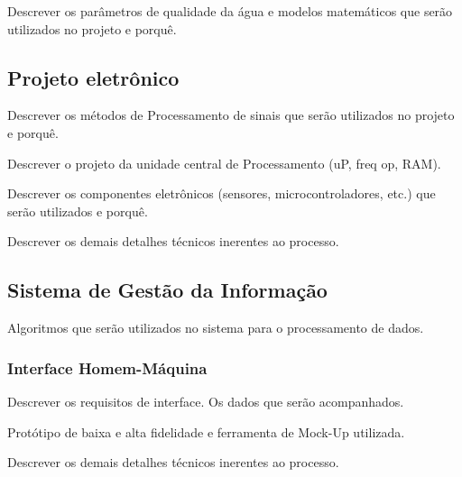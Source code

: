     Descrever os parâmetros de qualidade da água e modelos matemáticos que serão utilizados no projeto e porquê.
    
    \subsection{Projeto eletrônico}
    
      Descrever os métodos de Processamento de sinais que serão utilizados no projeto e porquê.
      
      Descrever o projeto da unidade central de Processamento (uP, freq op, RAM).
      
      Descrever os componentes eletrônicos (sensores, microcontroladores, etc.) que serão utilizados e porquê.
      
      Descrever os demais detalhes técnicos inerentes ao processo.
      
    \subsection{Sistema de Gestão da Informação}
    
      Algoritmos que serão utilizados no sistema para o processamento de dados.
      
      \subsubsection{Interface Homem-Máquina}
      
	Descrever os requisitos de interface. Os dados que serão acompanhados.
	
	Protótipo de baixa e alta fidelidade e ferramenta de Mock-Up utilizada.
      
      Descrever os demais detalhes técnicos inerentes ao processo.
	
	
      
    
    
    
    
    